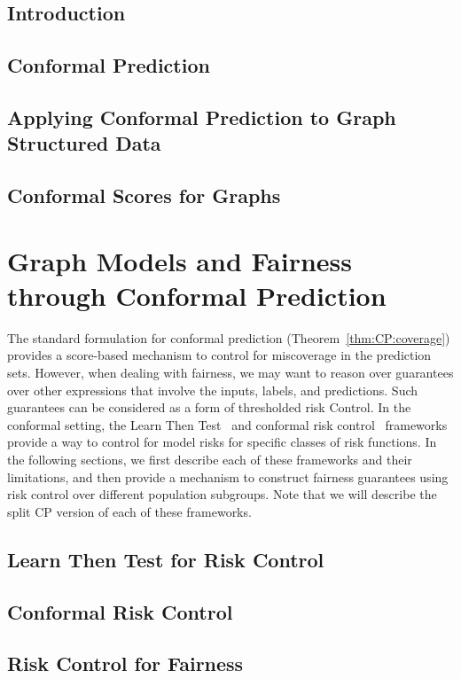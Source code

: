 \subsection{Introduction}


\subsection{Conformal Prediction}


\subsection{Applying Conformal Prediction to Graph Structured Data}


\subsection{Conformal Scores for Graphs}



\section{Graph Models and Fairness through Conformal Prediction}
The standard formulation for conformal prediction (Theorem~\ref{thm:CP:coverage}) provides a score-based mechanism to control for miscoverage in the prediction sets.
However, when dealing with fairness, we may want to reason over guarantees over other expressions that involve the inputs, labels, and predictions.
Such guarantees can be considered as a form of thresholded risk Control.
In the conformal setting, the Learn Then Test~\citep{angelopoulos2021learn} and conformal risk control~\citep{angelopoulos2024conformal} frameworks provide a way to control for model risks for specific classes of risk functions.
In the following sections, we first describe each of these frameworks and their limitations, and then provide a mechanism to construct fairness guarantees using risk control over different population subgroups.
Note that we will describe the split CP version of each of these frameworks.

\subsection{Learn Then Test for Risk Control}


\subsection{Conformal Risk Control}


\subsection{Risk Control for Fairness}

\begin{subappendices}
    
\end{subappendices}
